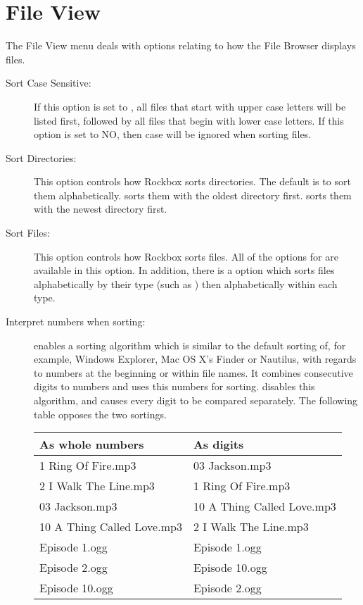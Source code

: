 \section{File View}
The File View menu deals with options relating to how the File Browser 
displays files.
%
\begin{description}
\item[Sort Case Sensitive:]
  If this option is set to , all files that start with upper case 
  letters will be listed first, followed by all files that begin with lower 
  case letters.  If this option is set to NO, then case will be ignored when 
  sorting files.
\item[Sort Directories:]
  This option controls how Rockbox sorts directories.  The default is to sort 
  them alphabetically.  sorts them with the oldest directory first. 
   sorts them with the newest directory first.
  
\item[Sort Files:]
  This option controls how Rockbox sorts files.  All of the options for 
   are available in this option.  In addition, there 
  is a  option which sorts files alphabetically by their type 
  (such as ) then alphabetically within each type.

\item[Interpret numbers when sorting:]
   enables a sorting algorithm which is similar to
  the default sorting of, for example, Windows Explorer, Mac OS X's Finder
  or Nautilus, with regards to numbers at the beginning or within file names.
  It combines consecutive digits to numbers and uses this numbers for sorting.
  \newline{} disables this algorithm, and causes every digit to
  be compared separately. The following table opposes the two sortings.
  \begin{table}
    \centering
    \begin{tabularx}{.8\textwidth}{ll}
    \toprule
      \textbf{As whole numbers} & \textbf{As digits}\\
      \midrule
      1 Ring Of Fire.mp3 & 03 Jackson.mp3\\
      2 I Walk The Line.mp3 & 1 Ring Of Fire.mp3\\
      03 Jackson.mp3 & 10 A Thing Called Love.mp3\\
      10 A Thing Called Love.mp3 & 2 I Walk The Line.mp3\\
      Episode 1.ogg & Episode 1.ogg\\
      Episode 2.ogg & Episode 10.ogg\\
      Episode 10.ogg & Episode 2.ogg\\
      \bottomrule
    \end{tabularx}
  \end{table}


\end{description}
